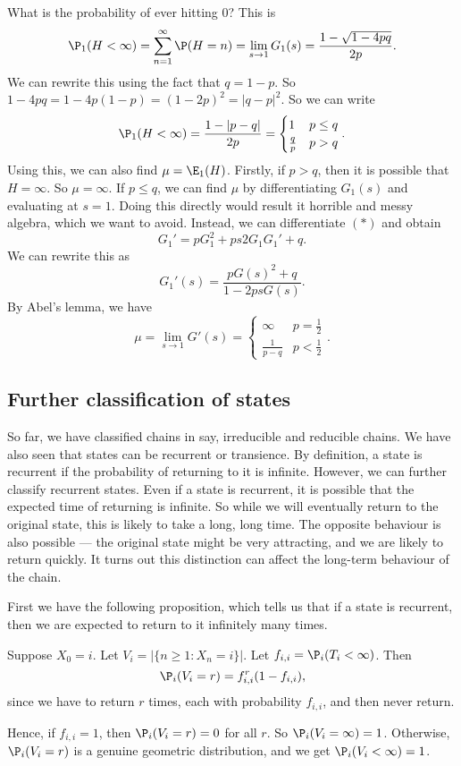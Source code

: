 \documentclass[a4paper]{article}
\begin{document}
\begin{eg}
  What is the probability of ever hitting $0$? This is
  \[
    \P_1(H < \infty) = \sum_{n = 1}^\infty \P(H = n) = \lim_{s\to 1} G_1(s) = \frac{1 - \sqrt{1 - 4pq}}{2p}.
  \]
  We can rewrite this using the fact that $q = 1 - p$. So $1 - 4pq = 1 - 4p(1 - p) = (1 - 2p)^2 = |q - p|^2$. So we can write
  \[
    \P_1(H < \infty) = \frac{1 - |p - q|}{2p} =
    \begin{cases}
      1 & p \leq q\\
      \frac{q}{p} & p > q
    \end{cases}.
  \]
  Using this, we can also find $\mu = \E_1(H)$. Firstly, if $p > q$, then it is possible that $H = \infty$. So $\mu = \infty$. If $p \leq q$, we can find $\mu$ by differentiating $G_1(s)$ and evaluating at $s = 1$. Doing this directly would result it horrible and messy algebra, which we want to avoid. Instead, we can differentiate $(*)$ and obtain
  \[
    G_1' = pG_1^2 + ps 2 G_1G_1' + q.
  \]
  We can rewrite this as
  \[
    G_1'(s) = \frac{pG(s)^2 + q}{1 - 2ps G(s)}.
  \]
  By Abel's lemma, we have
  \[
    \mu = \lim_{s \to 1}G'(s) =
    \begin{cases}
      \infty & p = \frac{1}{2}\\
      \frac{1}{p - q} & p < \frac{1}{2}
    \end{cases}.
  \]
\end{eg}

\subsection{Further classification of states}
So far, we have classified chains in say, irreducible and reducible chains. We have also seen that states can be recurrent or transience. By definition, a state is recurrent if the probability of returning to it is infinite. However, we can further classify recurrent states. Even if a state is recurrent, it is possible that the expected time of returning is infinite. So while we will eventually return to the original state, this is likely to take a long, long time. The opposite behaviour is also possible --- the original state might be very attracting, and we are likely to return quickly. It turns out this distinction can affect the long-term behaviour of the chain.

First we have the following proposition, which tells us that if a state is recurrent, then we are expected to return to it infinitely many times.
\begin{thm}
  Suppose $X_0 = i$. Let $V_i = |\{n \geq 1: X_n = i\}|$. Let $f_{i, i} = \P_i(T_i < \infty)$. Then
  \[
    \P_i (V_i = r) = f_{i, i}^r (1 - f_{i, i}),
  \]
  since we have to return $r$ times, each with probability $f_{i, i}$, and then never return.

  Hence, if $f_{i, i} = 1$, then $\P_i(V_i = r) = 0$ for all $r$. So $\P_i(V_i = \infty) = 1$. Otherwise, $\P_i(V_i = r)$ is a genuine geometric distribution, and we get $\P_i(V_i < \infty) = 1$.
\end{thm}
\end{document}
